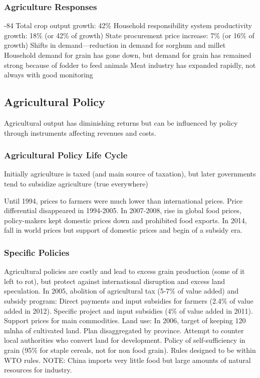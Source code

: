 \documentclass[11pt]{article}
\theoremstyle{definition}
\theoremstyle{remark}
\begin{document}
\subsubsection{Agriculture Responses}
\begin{outline}[enumerate]
-84
	\2 Total crop output growth: 42\%
	\2 Household responsibility system productivity growth: 18\% (or 42\% of growth)
	\2 State procurement price increase: 7\% (or 16\% of growth)
\1 Shifts in demand---reduction in demand for sorghum and millet
	\2 Household demand for grain has gone down, but demand for grain has remained strong because of fodder to feed animals
	\2  Meat industry has expanded rapidly, not always with good monitoring
\end{outline}

\subsection{Agricultural Policy}
Agricultural output has diminishing returns but can be influenced by policy through instruments affecting revenues and costs.
\subsubsection{Agricultural Policy Life Cycle}
Initially agriculture is taxed (and main source of taxation), but later governments tend to subsidize agriculture (true everywhere)
\begin{outline}[enumerate]
\1 Until 1994, prices to farmers were much lower than international prices.
\1 Price differential disappeared in 1994-2005. 
\1 In 2007-2008, rise in global food prices, policy-makers kept domestic prices down and prohibited food exports.
\1 In 2014, fall in world prices but support of domestic prices and begin of a subsidy era.
\subsubsection{Specific Policies}
Agricultural policies are costly and lead to excess grain production (some of it left to rot), but protect against international disruption and excess land speculation.
\1 In 2005, abolition of agricultural tax (5-7\% of value added) and subsidy program:
	\2 Direct payments and input subsidies for farmers (2.4\% of value added in 2012).
	\2 Specific project and input subsidies (4\% of value added in 2011).
	\2 Support prices for main commodities.
\1 Land use: In 2006, target of keeping 120 mlnha of cultivated land. Plan disaggregated by province. Attempt to counter local authorities who convert land for development.
\1 Policy of self-sufficiency in grain (95\% for staple cereals, not for non food grain). Rules designed to be within WTO rules.
	\2 NOTE: China imports very little food but large amounts of natural resources for industry.
\end{outline}
\end{document}
